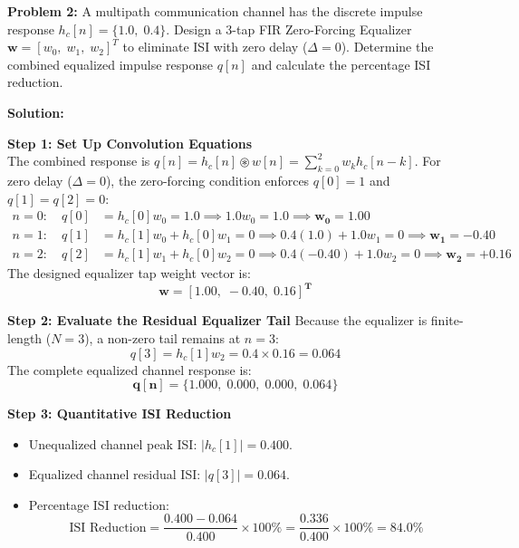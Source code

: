 \documentclass[11pt,a4paper]{article}
\begin{document}
\textbf{Problem 2:} A multipath communication channel has the discrete impulse response $h_c[n] = \{1.0, \; 0.4\}$. Design a 3-tap FIR Zero-Forcing Equalizer $\mathbf{w} = [w_0, \; w_1, \; w_2]^T$ to eliminate ISI with zero delay ($\Delta = 0$). Determine the combined equalized impulse response $q[n]$ and calculate the percentage ISI reduction.

\vspace{1mm}
\noindent\textbf{Solution:}

\noindent\textbf{Step 1: Set Up Convolution Equations} \\
The combined response is $q[n] = h_c[n] \circledast w[n] = \sum_{k=0}^2 w_k h_c[n-k]$. For zero delay ($\Delta = 0$), the zero-forcing condition enforces $q[0] = 1$ and $q[1] = q[2] = 0$:
\begin{align}
n = 0: \quad q[0] &= h_c[0] w_0 = 1.0 \implies 1.0 w_0 = 1.0 \implies \mathbf{w_0 = 1.00} \nonumber \\
n = 1: \quad q[1] &= h_c[1] w_0 + h_c[0] w_1 = 0 \implies 0.4(1.0) + 1.0 w_1 = 0 \implies \mathbf{w_1 = -0.40} \nonumber \\
n = 2: \quad q[2] &= h_c[1] w_1 + h_c[0] w_2 = 0 \implies 0.4(-0.40) + 1.0 w_2 = 0 \implies \mathbf{w_2 = +0.16}
\end{align}
The designed equalizer tap weight vector is:
\begin{equation}
\mathbf{w = [1.00, \; -0.40, \; 0.16]^T}
\end{equation}

\noindent\textbf{Step 2: Evaluate the Residual Equalizer Tail}
Because the equalizer is finite-length ($N=3$), a non-zero tail remains at $n = 3$:
\begin{equation}
q[3] = h_c[1] w_2 = 0.4 \times 0.16 = \mathbf{0.064}
\end{equation}
The complete equalized channel response is:
\begin{equation}
\mathbf{q[n] = \{1.000, \; 0.000, \; 0.000, \; 0.064\}}
\end{equation}

\noindent\textbf{Step 3: Quantitative ISI Reduction}
\begin{itemize}
    \item Unequalized channel peak ISI: $|h_c[1]| = \mathbf{0.400}$.
    \item Equalized channel residual ISI: $|q[3]| = \mathbf{0.064}$.
    \item Percentage ISI reduction:
    \begin{equation}
    \text{ISI Reduction} = \frac{0.400 - 0.064}{0.400} \times 100\% = \frac{0.336}{0.400} \times 100\% = \mathbf{84.0\%}
    \end{equation}
\end{itemize}
\end{document}
